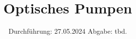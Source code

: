 

\subject{Versuch V21}
\title{Optisches Pumpen}
\date{%
  Durchführung: 27.05.2024
  \hspace{3em}
  Abgabe: tbd.
}



\maketitle
\thispagestyle{empty}
\tableofcontents
\newpage






\nocite{*}
\printbibliography



